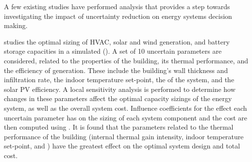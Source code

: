 
A few existing studies have performed analysis that provides a step towards investigating the impact of uncertainty reduction on energy systems decision making.

 studies the optimal sizing of HVAC, solar and wind generation, and battery storage capacities in a simulated  (). A set of 10 uncertain parameters are considered, related to the properties of the building, its thermal performance, and the efficiency of generation. These include the building's wall thickness and infiltration rate, the indoor temperature set-point, the  of the  system, and the solar PV efficiency. A local sensitivity analysis is performed to determine how changes in these parameters affect the optimal capacity sizings of the energy system, as well as the overall system cost. Influence coefficients for the effect each uncertain parameter has on the sizing of each system component and the cost are then computed using . It is found that the parameters related to the thermal performance of the building (internal thermal gain intensity, indoor temperature set-point, and  ) have the greatest effect on the optimal system design and total cost.

